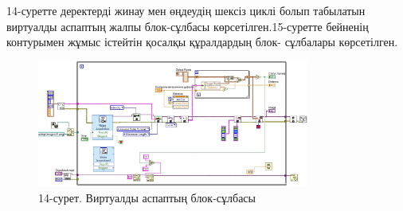 \begin{multicols}{2}
14-суретте деректерді жинау мен өңдеудің шексіз циклі болып табылатын
виртуалды аспаптың жалпы блок-сұлбасы көрсетілген.15-суретте бейненің
контурымен жұмыс істейтін қосалқы құралдардың блок- сұлбалары
көрсетілген.
\end{multicols}

\begin{figure}[H]
	\centering
	\includegraphics[width=0.8\textwidth]{media/ict2/image182}
	\caption*{14-сурет. Виртуалды аспаптың блок-сұлбасы}
\end{figure}

